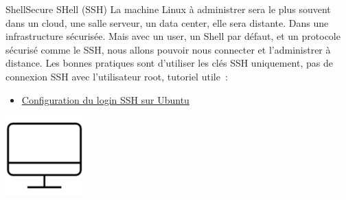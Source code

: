 \documentclass{beamer}
\begin{document}
    \begin{frame}{Shell}{Secure SHell (SSH)}
        La machine Linux à administrer sera le plus souvent dans un cloud, une salle serveur, un data center, elle sera distante.
        Dans une infrastructure sécurisée.
        \bigbreak
        Mais avec un user, un Shell par défaut, et un protocole sécurisé comme le SSH, nous allons pouvoir nous connecter et l'administrer à distance.
        \bigbreak
        Les bonnes pratiques sont d'utiliser les clés SSH uniquement, pas de connexion SSH avec l'utilisateur root,
        tutoriel utile~:
        \begin{itemize}
            \item \href{https://phoenixnap.com/kb/generate-setup-ssh-key-ubuntu}{Configuration du login SSH sur Ubuntu}
        \end{itemize}
        \bigbreak
        \centering
        \includegraphics[width=3cm]{image/desktop}
    \end{frame}
\end{document}
